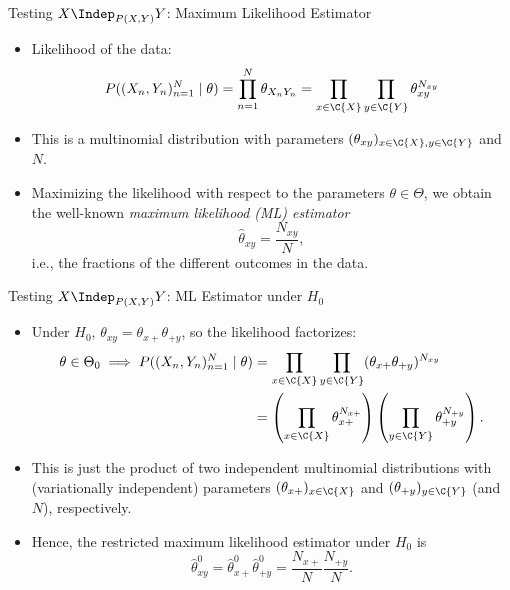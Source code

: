 \begin{frame}{Testing $X \Indep_{P(X,Y)} Y$: Maximum Likelihood Estimator}
  \begin{itemize}
    \item Likelihood of the data:
$$P((X_n,Y_n)_{n=1}^N \mid \theta) = \prod_{n=1}^N \theta_{X_nY_n} = \prod_{x\in\C{X}} \prod_{y\in\C{Y}} \theta_{xy}^{N_{xy}}$$
    \item This is a multinomial distribution with parameters $(\theta_{xy})_{x\in\C{X},y\in\C{Y}}$ and $N$.
    \item Maximizing the likelihood with respect to the parameters $\theta \in \Theta$, we obtain the well-known \emph{maximum likelihood (ML) estimator}
$$\hat \theta_{xy} = \frac{N_{xy}}{N},$$
i.e., the fractions of the different outcomes in the data.
  \end{itemize}
\end{frame}
 
\begin{frame}{Testing $X \Indep_{P(X,Y)} Y$: ML Estimator under $H_0$}
  \begin{itemize}
\item Under $H_0$, $\theta_{xy} = \theta_{x+}\theta_{+ y}$, so the likelihood factorizes:
\begin{equation*}\begin{split}
  \theta \in \Theta_0 \implies P((X_n,Y_n)_{n=1}^N \mid \theta) 
  &= \prod_{x\in\C{X}} \prod_{y\in\C{Y}} (\theta_{x+} \theta_{+ y})^{N_{xy}} \\
  &= \left(\prod_{x\in\C{X}} \theta_{x+}^{N_{x+}} \right) \left(\prod_{y\in\C{Y}} \theta_{+ y}^{N_{+ y}}\right).
\end{split}\end{equation*}
\item This is just the product of two independent multinomial distributions with (variationally independent) parameters
$(\theta_{x+})_{x\in\C{X}}$ and $(\theta_{+ y})_{y\in\C{Y}}$ (and $N$), respectively.
\item Hence, the restricted maximum likelihood estimator under $H_0$ is 
$$\hat \theta^0_{xy} = \hat \theta^0_{x+} \hat \theta^0_{+ y} = \frac{N_{x+}}{N} \frac{N_{+ y}}{N}.$$
  \end{itemize}
\end{frame}

